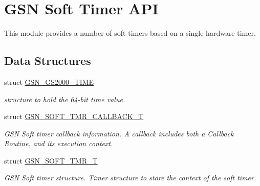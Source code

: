 \hypertarget{a00673}{
\section{GSN Soft Timer API}
\label{a00673}
}


This module provides a number of soft timers based on a single hardware timer.  


\subsection*{Data Structures}
\begin{DoxyCompactItemize}
\item 
struct \hyperlink{a00083}{GSN\_\-GS2000\_\-TIME}
\begin{DoxyCompactList}\small\item\em structure to hold the 64-\/bit time value. \end{DoxyCompactList}\item 
struct \hyperlink{a00228}{GSN\_\-SOFT\_\-TMR\_\-CALLBACK\_\-T}
\begin{DoxyCompactList}\small\item\em GSN Soft timer callback information. A callback includes both a Callback Routine, and its execution context. \end{DoxyCompactList}\item 
struct \hyperlink{a00229}{GSN\_\-SOFT\_\-TMR\_\-T}
\begin{DoxyCompactList}\small\item\em GSN Soft timer structure. Timer structure to store the context of the soft timer. \end{DoxyCompactList}\end{DoxyCompactItemize}
